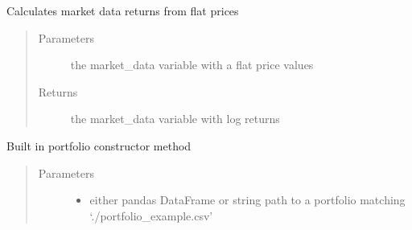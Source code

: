 \documentclass[letterpaper,10pt,english]{sphinxmanual}
\begin{document}
\begin{fulllineitems}
\begin{fulllineitems}
\begin{quote}
\begin{description}
\end{description}\end{quote}

\end{fulllineitems}


\begin{fulllineitems}
\label{\detokenize{securities:risk_dash.securities.Portfolio.calculate_portfolio_returns}}
\sphinxAtStartPar
Calculates market data returns from flat prices
\begin{quote}\begin{description}
\item[{Parameters}] \leavevmode
\sphinxAtStartPar
{} \textendash{} the market\_data variable with a flat price values

\item[{Returns}] \leavevmode
\sphinxAtStartPar
the market\_data variable with log returns

\end{description}\end{quote}

\end{fulllineitems}


\begin{fulllineitems}
\label{\detokenize{securities:risk_dash.securities.Portfolio.construct_portfolio_csv}}
\sphinxAtStartPar
Built in portfolio constructor method
\begin{quote}\begin{description}
\item[{Parameters}] \leavevmode\begin{itemize}
\item {} 
\sphinxAtStartPar
{} \textendash{} either pandas DataFrame or string path to a portfolio matching ‘./portfolio\_example.csv’


\end{itemize}
\end{description}
\end{quote}
\end{fulllineitems}
\end{fulllineitems}
\end{document}
